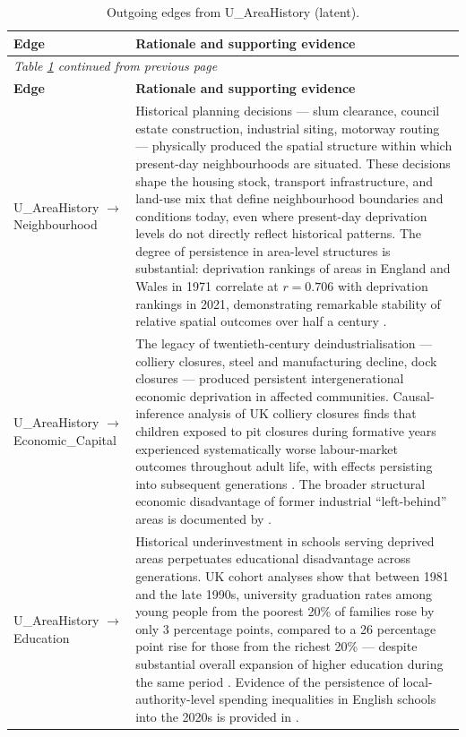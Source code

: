 
\begin{longtable}{@{}p{3.8cm}p{11.2cm}@{}}
\caption{Outgoing edges from U\_AreaHistory (latent).}
\label{tab:edges-areahistory}\\
\toprule
\textbf{Edge} & \textbf{Rationale and supporting evidence} \\
\midrule
\endfirsthead
\multicolumn{2}{l}{\textit{Table \ref{tab:edges-areahistory} continued from previous page}}\\
\toprule
\textbf{Edge} & \textbf{Rationale and supporting evidence} \\
\midrule
\endhead
\bottomrule
\endfoot
U\_AreaHistory $\to$ Neighbourhood & Historical planning decisions — slum clearance, council estate construction, industrial siting, motorway routing — physically produced the spatial structure within which present-day neighbourhoods are situated. These decisions shape the housing stock, transport infrastructure, and land-use mix that define neighbourhood boundaries and conditions today, even where present-day deprivation levels do not directly reflect historical patterns. The degree of persistence in area-level structures is substantial: deprivation rankings of areas in England and Wales in 1971 correlate at $r = 0.706$ with deprivation rankings in 2021, demonstrating remarkable stability of relative spatial outcomes over half a century \citep{lloyd_50-year_2024, nardone_relationship_2022}. \\
\addlinespace
U\_AreaHistory $\to$ Economic\_Capital & The legacy of twentieth-century deindustrialisation — colliery closures, steel and manufacturing decline, dock closures — produced persistent intergenerational economic deprivation in affected communities. Causal-inference analysis of UK colliery closures finds that children exposed to pit closures during formative years experienced systematically worse labour-market outcomes throughout adult life, with effects persisting into subsequent generations \citep{brey_death_2024}. The broader structural economic disadvantage of former industrial ``left-behind'' areas is documented by \citet{beatty_beyond_2021}. \\
\addlinespace
U\_AreaHistory $\to$ Education & Historical underinvestment in schools serving deprived areas perpetuates educational disadvantage across generations. UK cohort analyses show that between 1981 and the late 1990s, university graduation rates among young people from the poorest 20\% of families rose by only 3 percentage points, compared to a 26 percentage point rise for those from the richest 20\% — despite substantial overall expansion of higher education during the same period \citep{blanden_educational_2013}. Evidence of the persistence of local-authority-level spending inequalities in English schools into the 2020s is provided in \citet{akanni_inequalities_2025}. \\

\end{longtable}
